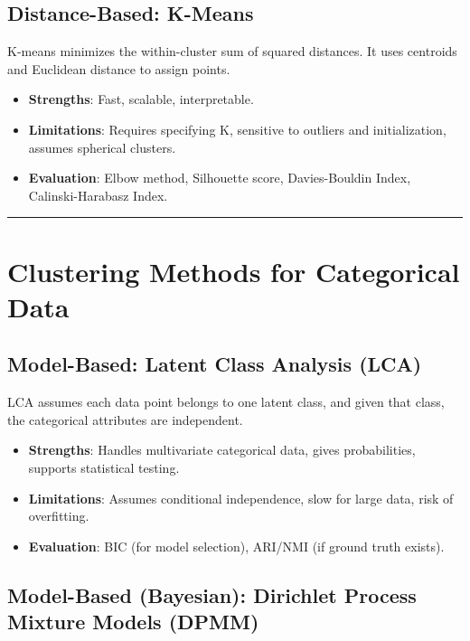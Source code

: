 \documentclass[
  letterpaper,
  DIV=11,
  numbers=noendperiod]{scrartcl}
\providecommand{\tightlist}{%
  \setlength{\itemsep}{0pt}\setlength{\parskip}{0pt}}\usepackage{longtable,booktabs,array}
\begin{document}
\subsection{Distance-Based: K-Means}\label{distance-based-k-means}

K-means minimizes the within-cluster sum of squared distances. It uses
centroids and Euclidean distance to assign points.

\begin{itemize}
\tightlist
\item
  \textbf{Strengths}: Fast, scalable, interpretable.
\item
  \textbf{Limitations}: Requires specifying K, sensitive to outliers and
  initialization, assumes spherical clusters.
\item
  \textbf{Evaluation}: Elbow method, Silhouette score, Davies-Bouldin
  Index, Calinski-Harabasz Index.
\end{itemize}

\begin{center}\rule{0.5\linewidth}{0.5pt}\end{center}

\section{Clustering Methods for Categorical
Data}\label{clustering-methods-for-categorical-data}

\subsection{Model-Based: Latent Class Analysis
(LCA)}\label{model-based-latent-class-analysis-lca}

LCA assumes each data point belongs to one latent class, and given that
class, the categorical attributes are independent.

\begin{itemize}
\tightlist
\item
  \textbf{Strengths}: Handles multivariate categorical data, gives
  probabilities, supports statistical testing.
\item
  \textbf{Limitations}: Assumes conditional independence, slow for large
  data, risk of overfitting.
\item
  \textbf{Evaluation}: BIC (for model selection), ARI/NMI (if ground
  truth exists).
\end{itemize}

\subsection{Model-Based (Bayesian): Dirichlet Process Mixture Models
(DPMM)}\label{model-based-bayesian-dirichlet-process-mixture-models-dpmm}
\end{document}
